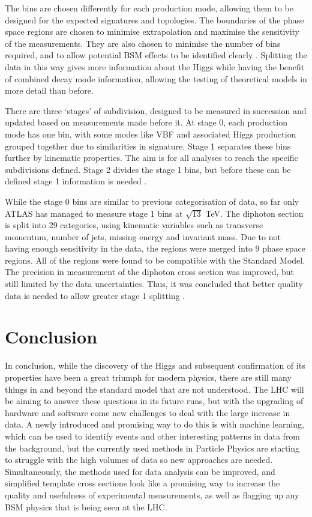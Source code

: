 \documentclass[12pt]{article}
\begin{document}
The bins are chosen differently for each production mode, allowing them to be designed for the expected signatures and topologies. The boundaries of the phase space regions are chosen to minimise extrapolation and maximise the sensitivity of the measurements. They are also chosen to minimise the number of bins required, and to allow potential BSM effects to be identified clearly \cite{stxs1}. Splitting the data in this way gives more information about the Higgs while having the benefit of combined decay mode information, allowing the testing of theoretical models in more detail than before. 

There are three `stages' of subdivision, designed to be measured in succession and updated based on measurements made before it. At stage 0, each production mode has one bin, with some modes like VBF and associated Higgs production grouped together due to similarities in signature. Stage 1 separates these bins further by kinematic properties. The aim is for all analyses to reach the specific subdivisions defined. Stage 2 divides the stage 1 bins, but before these can be defined stage 1 information is needed \cite{stxs1}. 


While the stage 0 bins are similar to previous categorisation of data, so far only ATLAS has managed to measure stage 1 bins at $\sqrt{13}$ TeV. The diphoton section is split into 29 categories, using kinematic variables such as transverse momentum, number of jets, missing energy and invariant mass. Due to not having enough sensitivity in the data, the regions were merged into 9 phase space regions. All of the regions were found to be compatible with the Standard Model. The precision in measurement of the diphoton cross section was improved, but still limited by the data uncertainties. Thus, it was concluded that better quality data is needed to allow greater stage 1 splitting \cite{stxs2}. 
 

\section*{Conclusion}
In conclusion, while the discovery of the Higgs and subsequent confirmation of its properties have been a great triumph for modern physics, there are still many things in and beyond the standard model that are not understood. The LHC will be aiming to answer these questions in its future runs, but with the upgrading of hardware and software come new challenges to deal with the large increase in data. A newly introduced and promising way to do this is with machine learning, which can be used to identify events and other interesting patterns in data from the background, but the currently used methods in Particle Physics are starting to struggle with the high volumes of data so new approaches are needed. Simultaneously, the methods used for data analysis can be improved, and simplified template cross sections look like a promising way to increase the quality and usefulness of experimental measurements, as well as flagging up any BSM physics that is being seen at the LHC.


{}

\end{document}
